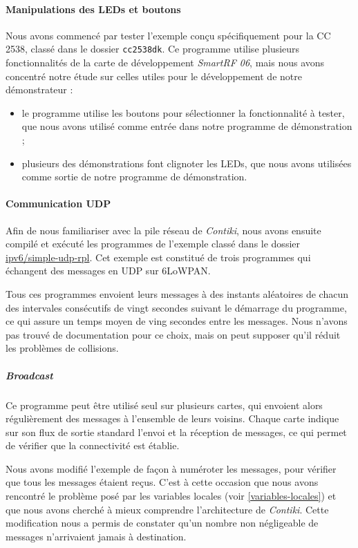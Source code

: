 \paragraph{Manipulations des LEDs et boutons}

Nous avons commencé par tester l’exemple conçu spécifiquement pour la CC 2538, classé dans le dossier \texttt{cc2538dk}.
Ce programme utilise plusieurs fonctionnalités de la carte de développement \emph{SmartRF 06}, mais nous avons concentré notre étude sur celles utiles pour le développement de notre démonstrateur :

\begin{itemize}
	\item le programme utilise les boutons pour sélectionner la fonctionnalité à tester, que nous avons utilisé comme entrée dans notre programme de démonstration ;
	\item plusieurs des démonstrations font clignoter les LEDs, que nous avons utilisées comme sortie de notre programme de démonstration.
\end{itemize}

\paragraph{Communication UDP}

Afin de nous familiariser avec la pile réseau de \emph{Contiki}, nous avons ensuite compilé et exécuté les programmes de l’exemple classé dans le dossier \url{ipv6/simple-udp-rpl}.
Cet exemple est constitué de trois programmes qui échangent des messages en UDP sur 6LoWPAN.

Tous ces programmes envoient leurs messages à des instants aléatoires de chacun des intervales consécutifs de vingt secondes suivant le démarrage du programme, ce qui assure un temps moyen de ving secondes entre les messages.
Nous n’avons pas trouvé de documentation pour ce choix, mais on peut supposer qu’il réduit les problèmes de collisions.

\subparagraph{\textit{Broadcast}}

Ce programme peut être utilisé seul sur plusieurs cartes, qui envoient alors régulièrement des messages à l’ensemble de leurs voisins.
Chaque carte indique sur son flux de sortie standard l’envoi et la réception de messages, ce qui permet de vérifier que la connectivité est établie.

Nous avons modifié l’exemple de façon à numéroter les messages, pour vérifier que tous les messages étaient reçus.
C’est à cette occasion que nous avons rencontré le problème posé par les variables locales (voir \cref{variables-locales}) et que nous avons cherché à mieux comprendre l’architecture de \emph{Contiki}.
Cette modification nous a permis de constater qu’un nombre non négligeable de messages n’arrivaient jamais à destination.

